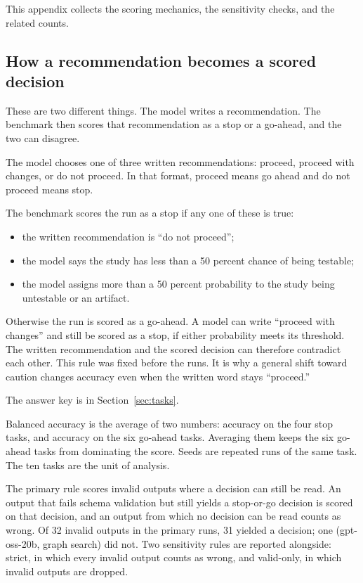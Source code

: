 \documentclass[11pt]{article}
\begin{document}
This appendix collects the scoring mechanics, the sensitivity checks, and the related counts.

\subsection*{How a recommendation becomes a scored decision}

These are two different things. The model writes a recommendation. The benchmark then scores that recommendation as a stop or a go-ahead, and the two can disagree.

The model chooses one of three written recommendations: proceed, proceed with changes, or do not proceed. In that format, proceed means go ahead and do not proceed means stop.

The benchmark scores the run as a stop if any one of these is true:

\begin{itemize}
\item the written recommendation is ``do not proceed'';
\item the model says the study has less than a 50 percent chance of being testable;
\item the model assigns more than a 50 percent probability to the study being untestable or an artifact.
\end{itemize}

Otherwise the run is scored as a go-ahead. A model can write ``proceed with changes'' and still be scored as a stop, if either probability meets its threshold. The written recommendation and the scored decision can therefore contradict each other. This rule was fixed before the runs. It is why a general shift toward caution changes accuracy even when the written word stays ``proceed.''

The answer key is in Section~\ref{sec:tasks}.

Balanced accuracy is the average of two numbers: accuracy on the four stop tasks, and accuracy on the six go-ahead tasks. Averaging them keeps the six go-ahead tasks from dominating the score. Seeds are repeated runs of the same task. The ten tasks are the unit of analysis.

The primary rule scores invalid outputs where a decision can still be read. An output that fails schema validation but still yields a stop-or-go decision is scored on that decision, and an output from which no decision can be read counts as wrong. Of 32 invalid outputs in the primary runs, 31 yielded a decision; one (gpt-oss-20b, graph search) did not. Two sensitivity rules are reported alongside: strict, in which every invalid output counts as wrong, and valid-only, in which invalid outputs are dropped.
\end{document}

